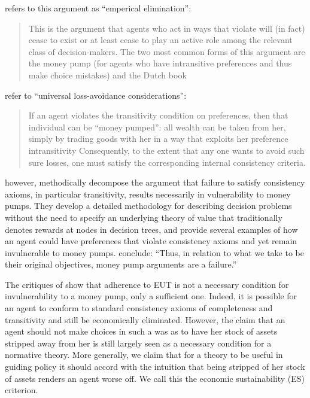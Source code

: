 \documentclass[../main.tex]{subfiles}
\begin{document}
\textcite[402-403]{Hands2014} refers to this argument as \enquote{emperical elimination}:
\blockquote{
This is the argument that agents who act in ways that violate  will (in fact) cease to exist or at least cease to play an active role among the relevant class of decision-makers.
The two most common forms of this argument are the money pump (for agents who have intransitive preferences and thus make choice mistakes) and the Dutch book\textelp{}
}

\noindent \textcite[336]{Grune-Yanoff2014} refer to \enquote{universal loss-avoidance considerations}:
\blockquote{
If an agent violates the transitivity condition on preferences, then that individual can be \enquote{money pumped}:
all wealth can be taken from her, simply by trading goods with her in a way that exploits her preference intransitivity\textelp{}
Consequently, to the extent that any one wants to avoid such sure losses, one must satisfy the corresponding internal consistency criteria.
}

\textcite{Cubitt2001} however, methodically decompose the argument that failure to satisfy consistency axioms, in particular transitivity, results necessarily in vulnerability to money pumps.
They develop a detailed methodology for describing decision problems without the need to specify an underlying theory of value that traditionally denotes rewards at nodes in decision trees, and provide several examples of how an agent could have preferences that violate consistency axioms and yet remain invulnerable to money pumps.{\footnotemark}
\textcite[154]{Cubitt2001} conclude: \enquote{Thus, in relation to what we take to be their original objectives, money pump arguments are a failure.}

\addtocounter{footnote}{-1}

The critiques of \textcite{Cubitt2001} show that adherence to EUT is not a necessary condition for invulnerability to a money pump, only a sufficient one.
Indeed, it is possible for an agent to conform to standard consistency axioms of completeness and transitivity and still be economically eliminated.{\footnotemark}
However, the claim that an agent should not make choices in such a was as to have her stock of assets stripped away from her is still largely seen as a necessary condition for a normative theory.
More generally, we claim that for a theory to be useful in guiding policy it should accord with the intuition that being stripped of her stock of assets renders an agent worse off.{\footnotemark}
We call this the economic sustainability (ES) criterion.
\end{document}
